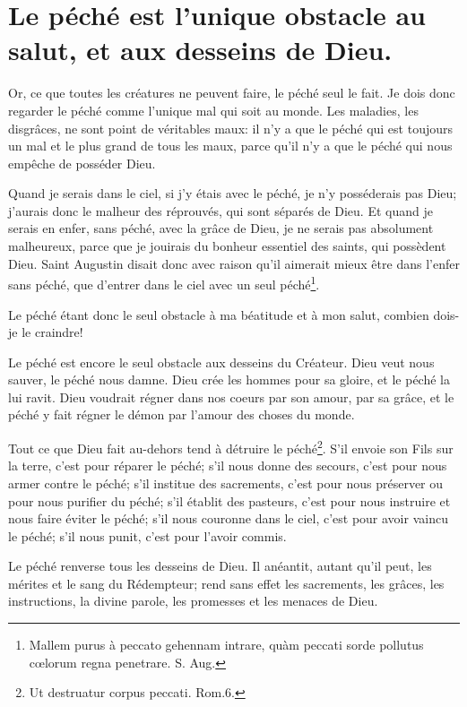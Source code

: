 \documentclass[instructions.tex]{subfiles}
\begin{document}
\chapter{Le péché est l'unique obstacle au salut, et aux desseins de Dieu.}


Or, ce que toutes les créatures ne peuvent faire, le péché seul le fait. Je dois donc regarder le péché comme l'unique mal qui soit au monde. Les maladies, les disgrâces, ne sont point de véritables maux: il n'y a que le péché qui est toujours un mal et le plus grand de tous les maux, parce qu'il n'y a que le péché qui nous empêche de posséder Dieu.

Quand je serais dans le ciel, si j'y étais avec le péché, je n'y posséderais pas Dieu; j'aurais donc le malheur des réprouvés, qui sont séparés de Dieu. Et quand je serais en enfer, sans péché, avec la grâce de Dieu, je ne serais pas absolument malheureux, parce que je jouirais du bonheur essentiel des saints, qui possèdent Dieu. Saint Augustin disait donc avec raison qu'il aimerait mieux être dans l'enfer sans péché, que d'entrer dans le ciel avec un seul péché\footnote{Mallem purus à peccato gehennam intrare, quàm peccati sorde pollutus cœlorum regna penetrare. S. Aug.}.

Le péché étant donc le seul obstacle à ma béatitude et à mon salut, combien dois-je le craindre!


\primo Le péché est encore le seul obstacle aux desseins du Créateur. Dieu veut nous sauver, le péché nous damne. Dieu crée les hommes pour sa gloire, et le péché la lui ravit. Dieu voudrait régner dans nos coeurs par son amour, par sa grâce, et le péché y fait régner le démon par l'amour des choses du monde.

Tout ce que Dieu fait au-dehors tend à détruire le péché\footnote{Ut destruatur corpus peccati. Rom.6.}. S'il envoie son Fils sur la terre, c'est pour réparer le péché; s'il nous donne des secours, c'est pour nous armer contre le péché; s'il institue des sacrements, c'est pour nous préserver ou pour nous purifier du péché; s'il établit des pasteurs, c'est pour nous instruire et nous faire éviter le péché; s'il nous couronne dans le ciel, c'est pour avoir vaincu le péché; s'il nous punit, c'est pour l'avoir commis.

Le péché renverse tous les desseins de Dieu. Il anéantit, autant qu'il peut, les mérites et le sang du Rédempteur; rend sans effet les sacrements, les grâces, les instructions, la divine parole, les promesses et les menaces de Dieu.
\end{document}
